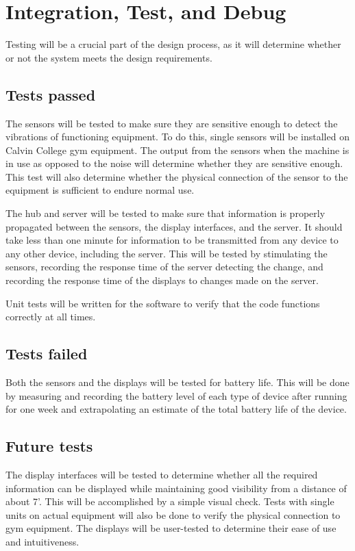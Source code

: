 \documentclass[PPFS.tex]{template/subfiles}
\begin{document}
\section{Integration, Test, and Debug}
Testing will be a crucial part of the design process, as it will determine whether or not the system meets the design requirements.

\subsection{Tests passed}
The sensors will be tested to make sure they are sensitive enough to detect the vibrations of functioning equipment.  To do this, single sensors will be installed on Calvin College gym equipment. The output from the sensors when the machine is in use as opposed to the noise will determine whether they are sensitive enough. This test will also determine whether the physical connection of the sensor to the equipment is sufficient to endure normal use.

The hub and server will be tested to make sure that information is properly propagated between the sensors, the display interfaces, and the server. It should take less than one minute for information to be transmitted from any device to any other device, including the server. This will be tested by stimulating the sensors, recording the response time of the server detecting the change, and recording the response time of the displays to changes made on the server.

Unit tests will be written for the software to verify that the code functions correctly at all times.
\subsection{Tests failed}
Both the sensors and the displays will be tested for battery life. This will be done by measuring and recording the battery level of each type of device after running for one week and extrapolating an estimate of the total battery life of the device.
\subsection{Future tests}
The display interfaces will be tested to determine whether all the required information can be displayed while maintaining good visibility from a distance of about 7'. This will be accomplished by a simple visual check. Tests with single units on actual equipment will also be done to verify the physical connection to gym equipment. The displays will be user-tested to determine their ease of use and intuitiveness.
\end{document}
